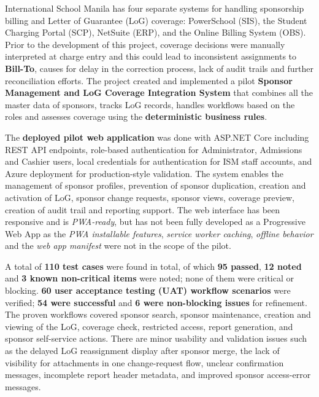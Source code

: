 
\begin{abstractwithpageno}
International School Manila has four separate systems for handling sponsorship billing and Letter of Guarantee (LoG) coverage: PowerSchool (SIS), the Student Charging Portal (SCP), NetSuite (ERP), and the Online Billing System (OBS). Prior to the development of this project, coverage decisions were manually interpreted at charge entry and this could lead to inconsistent assignments to \textbf{Bill-To}, causes for delay in the correction process, lack of audit trails and further reconciliation efforts. The project created and implemented a pilot \textbf{Sponsor Management and LoG Coverage Integration System} that combines all the master data of sponsors, tracks LoG records, handles workflows based on the roles and assesses coverage using the \textbf{deterministic business rules}.

The \textbf{deployed pilot web application} was done with ASP.NET Core including REST API endpoints, role-based authentication for Administrator, Admissions and Cashier users, local credentials for authentication for ISM staff accounts, and Azure deployment for production-style validation. The system enables the management of sponsor profiles, prevention of sponsor duplication, creation and activation of LoG, sponsor change requests, sponsor views, coverage preview, creation of audit trail and reporting support. The web interface has been responsive and is \textit{PWA-ready}, but has not been fully developed as a Progressive Web App as the \textit{PWA installable features}, \textit{service worker caching}, \textit{offline behavior} and the \textit{web app manifest} were not in the scope of the pilot.

A total of \textbf{110 test cases} were found in total, of which \textbf{95 passed}, \textbf{12 noted} and \textbf{3 known non-critical items} were noted; none of them were critical or blocking. \textbf{60 user acceptance testing (UAT) workflow scenarios} were verified; \textbf{54 were successful} and \textbf{6 were non-blocking issues} for refinement. The proven workflows covered sponsor search, sponsor maintenance, creation and viewing of the LoG, coverage check, restricted access, report generation, and sponsor self-service actions. There are minor usability and validation issues such as the delayed LoG reassignment display after sponsor merge, the lack of visibility for attachments in one change-request flow, unclear confirmation messages, incomplete report header metadata, and improved sponsor access-error messages.


\end{abstractwithpageno}
